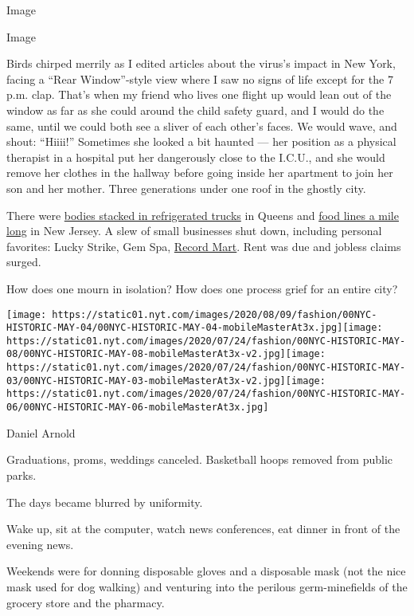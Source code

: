 Image

Image

Birds chirped merrily as I edited articles about the virus's impact in
New York, facing a ``Rear Window''-style view where I saw no signs of
life except for the 7 p.m. clap. That's when my friend who lives one
flight up would lean out of the window as far as she could around the
child safety guard, and I would do the same, until we could both see a
sliver of each other's faces. We would wave, and shout: ``Hiiii!''
Sometimes she looked a bit haunted --- her position as a physical
therapist in a hospital put her dangerously close to the I.C.U., and she
would remove her clothes in the hallway before going inside her
apartment to join her son and her mother. Three generations under one
roof in the ghostly city.

There were
\href{https://www.nytimes.com/2020/04/30/nyregion/coronavirus-nyc-funeral-home-morgue-bodies.html}{bodies
stacked in refrigerated trucks} in Queens and
\href{https://www.nytimes.com/2020/04/30/nyregion/coronavirus-nj-hunger.html}{food
lines a mile long} in New Jersey. A slew of small businesses shut down,
including personal favorites: Lucky Strike, Gem Spa,
\href{https://untappedcities.com/2020/06/10/closed-record-mart-manhattans-oldest-record-store-located-in-times-square-subway-station/}{Record
Mart}. Rent was due and jobless claims surged.

How does one mourn in isolation? How does one process grief for an
entire city?

\texttt{[image: https://static01.nyt.com/images/2020/08/09/fashion/00NYC-HISTORIC-MAY-04/00NYC-HISTORIC-MAY-04-mobileMasterAt3x.jpg]}\texttt{[image: https://static01.nyt.com/images/2020/07/24/fashion/00NYC-HISTORIC-MAY-08/00NYC-HISTORIC-MAY-08-mobileMasterAt3x-v2.jpg]}\texttt{[image: https://static01.nyt.com/images/2020/07/24/fashion/00NYC-HISTORIC-MAY-03/00NYC-HISTORIC-MAY-03-mobileMasterAt3x-v2.jpg]}\texttt{[image: https://static01.nyt.com/images/2020/07/24/fashion/00NYC-HISTORIC-MAY-06/00NYC-HISTORIC-MAY-06-mobileMasterAt3x.jpg]}

Daniel Arnold

Graduations, proms, weddings canceled. Basketball hoops removed from
public parks.

The days became blurred by uniformity.

Wake up, sit at the computer, watch news conferences, eat dinner in
front of the evening news.

Weekends were for donning disposable gloves and a disposable mask (not
the nice mask used for dog walking) and venturing into the perilous
germ-minefields of the grocery store and the pharmacy.

